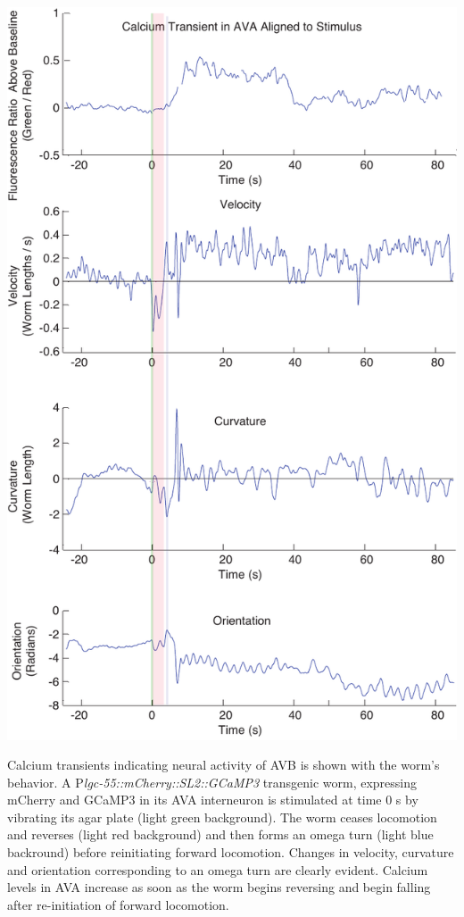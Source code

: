 \begin{FPfigure}  %
\includegraphics[width=\textwidth]{figures/omegaAVBrep}
\caption[Neural activity of AVB and associated behavior.]{Calcium transients indicating neural activity of AVB is shown with the worm's behavior.  A P\textit{lgc-55::mCherry::SL2::GCaMP3} transgenic worm, expressing mCherry and GCaMP3 in its AVA interneuron is stimulated at time 0 s by vibrating its agar plate (light green background).  The worm ceases locomotion and reverses (light red background) and then forms an omega turn (light blue backround) before reinitiating forward locomotion. Changes in velocity, curvature and orientation corresponding to an omega turn are clearly evident.  Calcium levels in AVA increase as soon as the worm begins reversing and begin falling after re-initiation of forward locomotion. \label{fig:omegaAVBrep}}
\end{FPfigure}




